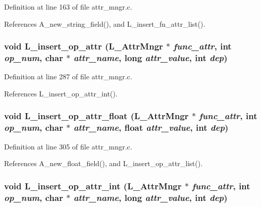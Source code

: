 Definition at line 163 of file attr\_\-mngr.c.

References A\_\-new\_\-string\_\-field(), and L\_\-insert\_\-fn\_\-attr\_\-list().
\subsubsection{\setlength{\rightskip}{0pt plus 5cm}void L\_\-insert\_\-op\_\-attr (\bf{L\_\-Attr\-Mngr} $\ast$ {\em func\_\-attr}, int {\em op\_\-num}, char $\ast$ {\em attr\_\-name}, long {\em attr\_\-value}, int {\em dep})}\label{attr__mngr_8h_68aa3ecdd17e441baab84bba0b675782}




Definition at line 287 of file attr\_\-mngr.c.

References L\_\-insert\_\-op\_\-attr\_\-int().
\subsubsection{\setlength{\rightskip}{0pt plus 5cm}void L\_\-insert\_\-op\_\-attr\_\-float (\bf{L\_\-Attr\-Mngr} $\ast$ {\em func\_\-attr}, int {\em op\_\-num}, char $\ast$ {\em attr\_\-name}, float {\em attr\_\-value}, int {\em dep})}\label{attr__mngr_8h_806c6ea4c63be25bb18917d9b7f0e458}




Definition at line 305 of file attr\_\-mngr.c.

References A\_\-new\_\-float\_\-field(), and L\_\-insert\_\-op\_\-attr\_\-list().
\subsubsection{\setlength{\rightskip}{0pt plus 5cm}void L\_\-insert\_\-op\_\-attr\_\-int (\bf{L\_\-Attr\-Mngr} $\ast$ {\em func\_\-attr}, int {\em op\_\-num}, char $\ast$ {\em attr\_\-name}, long {\em attr\_\-value}, int {\em dep})}\label{attr__mngr_8h_72d2e485b9aed008ec48ba1a098d5b18}




